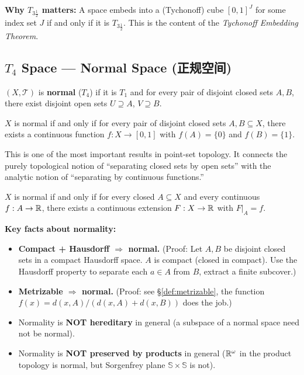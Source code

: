 \documentclass{article}
\begin{document}
\textbf{Why $T_{3\frac{1}{2}}$ matters:} A space embeds into a (Tychonoff)
cube $[0,1]^J$ for some index set $J$ if and only if it is $T_{3\frac{1}{2}}$.
This is the content of the \emph{Tychonoff Embedding Theorem}.

\subsection{$T_4$ Space --- Normal Space (正规空间)}\label{def:T4}
\begin{definition}
  $(X, \mathcal{T})$ is \textbf{normal} ($T_4$) if it is $T_1$ and for
  every pair of disjoint closed sets $A, B$, there exist disjoint open
  sets $U \supseteq A$, $V \supseteq B$.
\end{definition}

\begin{theorem}
  $X$ is normal if and only if for every pair of disjoint closed sets
  $A, B \subseteq X$, there exists a continuous function
  $f : X \to [0,1]$ with $f(A) = \{0\}$ and $f(B) = \{1\}$.
\end{theorem}

This is one of the most important results in point-set topology. It connects
the purely topological notion of ``separating closed sets by open sets'' with
the analytic notion of ``separating by continuous functions.''

\begin{theorem}
  $X$ is normal if and only if for every closed $A \subseteq X$ and every
  continuous $f : A \to \mathbb{R}$, there exists a continuous extension
  $F : X \to \mathbb{R}$ with $F|_A = f$.
\end{theorem}

\textbf{Key facts about normality:}
\begin{itemize}
  \item \textbf{Compact + Hausdorff $\Rightarrow$ normal.}
    (Proof: Let $A, B$ be disjoint closed sets in a compact Hausdorff space.
      $A$ is compact (closed in compact). Use the Hausdorff property to
    separate each $a \in A$ from $B$, extract a finite subcover.)
  \item \textbf{Metrizable $\Rightarrow$ normal.}
    (Proof: see \S\ref{def:metrizable}, the function
    $f(x) = d(x,A)/(d(x,A)+d(x,B))$ does the job.)
  \item Normality is \textbf{NOT hereditary} in general
    (a subspace of a normal space need not be normal).
  \item Normality is \textbf{NOT preserved by products} in general
    ($\mathbb{R}^\omega$ in the product topology is normal, but
    Sorgenfrey plane $\mathbb{S} \times \mathbb{S}$ is not).
\end{itemize}
\end{document}
